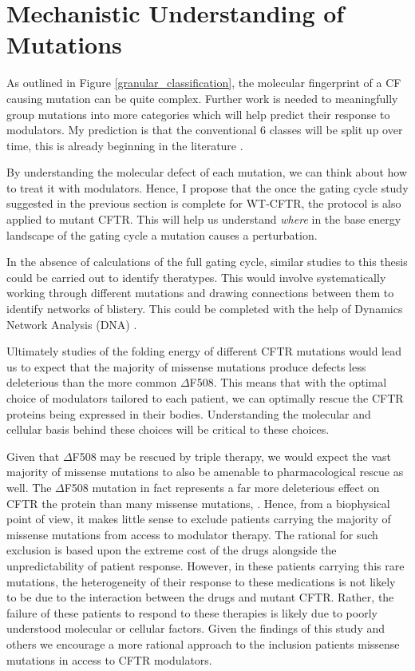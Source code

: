 \section{Mechanistic Understanding of Mutations}
As outlined in Figure \ref{granular_classification}, the molecular fingerprint of a CF causing mutation can be quite complex. Further work is needed to meaningfully group mutations into more categories which will help predict their response to modulators. My prediction is that the conventional 6 classes will be split up over time, this is already beginning in the literature \cite{}. 

By understanding the molecular defect of each mutation, we can think about how to treat it with modulators. Hence, I propose that the once the gating cycle study suggested in the previous section is complete for WT-CFTR, the protocol is also applied to mutant CFTR. This will help us understand \textit{where} in the base energy landscape of the gating cycle a mutation causes a perturbation. 

In the absence of calculations of the full gating cycle, similar studies to this thesis could be carried out to identify theratypes. This would involve systematically working through different mutations and drawing connections between them to identify networks of blistery. This could be completed with the help of Dynamics Network Analysis (DNA) \cite{melo2020}. 


Ultimately studies of the folding energy of different CFTR mutations would lead us to expect that the majority of missense mutations produce defects less deleterious than the more common $\Delta$F508. This means that with the optimal choice of modulators tailored to each patient, we can optimally rescue the CFTR proteins being expressed in their bodies. Understanding the molecular and cellular basis behind these choices will be critical to these choices.

Given that $\Delta$F508 may be rescued by triple therapy, we would expect the vast majority of missense mutations to also be amenable to pharmacological rescue as well. The $\Delta$F508 mutation in fact represents a far more deleterious effect on CFTR the protein than many missense mutations, \cite{bahia2021}. Hence, from a biophysical point of view, it makes little sense to exclude patients carrying the majority of missense mutations from access to modulator therapy. The rational for such exclusion is based upon the extreme cost of the drugs alongside the unpredictability of patient response. However, in these patients carrying this rare mutations, the heterogeneity of their response to these medications is not likely to be due to the interaction between the drugs and mutant CFTR. Rather, the failure of these patients to respond to these therapies is likely due to poorly understood molecular or cellular factors. Given the findings of this study and others we encourage a more rational approach to the inclusion patients missense mutations in access to CFTR modulators. 
